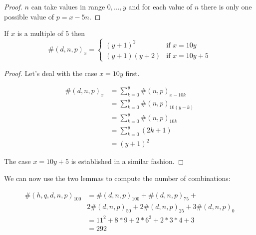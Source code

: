 \begin{proof}
 $n$ can take values in range $0, \ldots, y$ and for each value of $n$ there is only one possible value of $p = x - 5n$.
\end{proof}

\begin{lem}\label{dnp}
If $x$ is a multiple of $5$ then
\begin{equation*}
\#(d, n, p)_{x} = 
   \begin{cases}
       (y + 1)^2 & \text{if $x = 10 y$}\\
       (y + 1)(y + 2) & \text{if $x = 10y + 5$}
    \end{cases}   
\end{equation*}  
\end{lem}

\begin{proof}
 
Let's deal with the case $x = 10y$ first.

\begin{equation*}
    \begin{split}
      \#(d, n, p)_{x} & = \sum_{k = 0}^{y} \#(n, p)_{x - 10k}\\
                               & =  \sum_{k = 0}^{y} \#(n, p)_{10 (y - k)} \\
                               & =  \sum_{k = 0}^{y} \#(n, p)_{10 k} \\
                               & =  \sum_{k = 0}^{y} (2 k + 1) \\
                               & = (y + 1)^2
    \end{split}
\end{equation*}  

The case $x = 10y + 5$ is established in a similar fashion.
\end{proof}

We can now use the two lemmas to compute the number of combinations:

\begin{equation*}
    \begin{split}
     \#(h, q, d, n, p)_{100} & =\#(d, n, p)_{100} +  \#(d, n, p)_{75} +\\
            & 2 \#(d, n, p)_{50} + 2 \#(d, n, p)_{25} + 3 \#(d, n, p)_0\\
                               & =  11^2 +  8 * 9 + 2 * 6^2 + 2 * 3 * 4 + 3\\
                               & = 292
    \end{split}
\end{equation*}  


